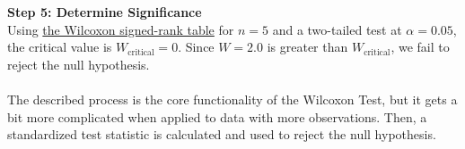 	\textbf{Step 5: Determine Significance}\\
	Using \href{https://de.wikipedia.org/wiki/Wilcoxon-Vorzeichen-Rang-Test#Teststatistik}{the Wilcoxon signed-rank table} for \( n = 5 \) and a two-tailed test at \( \alpha = 0.05 \), the critical value is \( W_\text{critical} = 0 \). Since \( W = 2.0 \) is greater than \( W_\text{critical} \), we fail to reject the null hypothesis.\\
	\\
	The described process is the core functionality of the Wilcoxon Test, but it gets a bit more complicated when applied to data with more observations. Then, a standardized test statistic is calculated and used to reject the null hypothesis.
	
	
	
	
